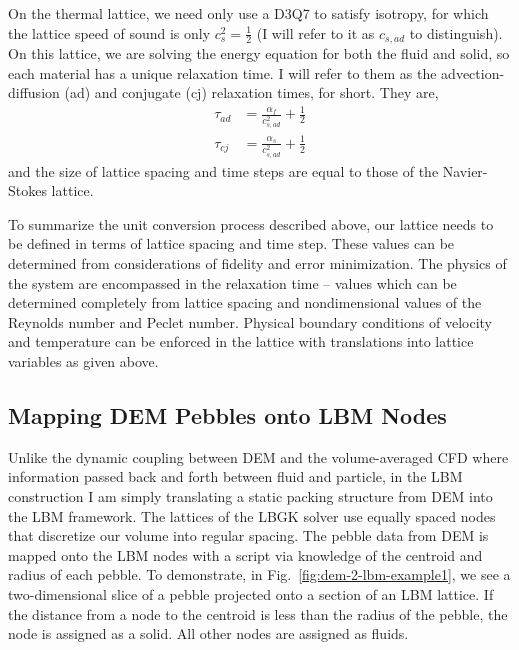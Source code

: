 On the thermal lattice, we need only use a D3Q7 to satisfy isotropy, for which the lattice speed of sound is only $c_s^2 = \frac{1}{2}$ (I will refer to it as $c_{s,ad}$ to distinguish). On this lattice, we are solving the energy equation for both the fluid and solid, so each material has a unique relaxation time. I will refer to them as the advection-diffusion (ad) and conjugate (cj) relaxation times, for short. They are,
\begin{subequations}
\begin{align}
	\tau_{ad} &= \frac{\alpha_f}{c_{s,ad}^2} + \frac{1}{2} \\
	\tau_{cj} &= \frac{\alpha_s}{c_{s,ad}^2} + \frac{1}{2}
\end{align}
\end{subequations}
and the size of lattice spacing and time steps are equal to those of the Navier-Stokes lattice.

To summarize the unit conversion process described above, our lattice needs to be defined in terms of lattice spacing and time step. These values can be determined from considerations of fidelity and error minimization. The physics of the system are encompassed in the relaxation time -- values which can be determined completely from lattice spacing and nondimensional values of the Reynolds number and Peclet number. Physical boundary conditions of velocity and temperature can be enforced in the lattice with translations into lattice variables as given above. %




\subsection{Mapping DEM Pebbles onto LBM Nodes}\label{sec:dem2lbm-mapping}

Unlike the dynamic coupling between DEM and the volume-averaged CFD where information passed back and forth between fluid and particle, in the LBM construction I am simply translating a static packing structure from DEM into the LBM framework. The lattices of the LBGK solver use equally spaced nodes that discretize our volume into regular spacing. The pebble data from DEM is mapped onto the LBM nodes with a script via knowledge of the centroid and radius of each pebble. To demonstrate, in Fig.~\ref{fig:dem-2-lbm-example1}, we see a two-dimensional slice of a pebble projected onto a section of an LBM lattice. If the distance from a node to the centroid is less than the radius of the pebble, the node is assigned as a solid. All other nodes are assigned as fluids.

